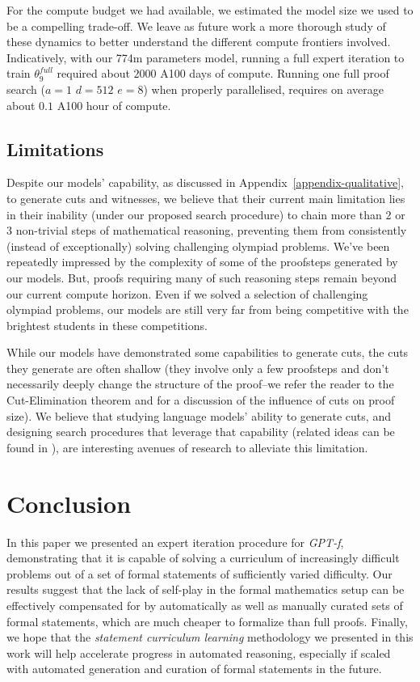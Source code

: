 \documentclass[nohyperref]{article}
\theoremstyle{plain}
\theoremstyle{definition}
\theoremstyle{remark}
\begin{document}
For the compute budget we had available, we estimated the model size we used to be a compelling trade-off. We leave as future work a more thorough study of these dynamics to better understand the different compute frontiers involved. Indicatively, with our 774m parameters model, running a full expert iteration to train $\theta_9^{\textit{full}}$ required about $2000$ A100 days of compute. Running one full proof search ($a=1$ $d=512$ $e=8$) when properly parallelised, requires on average about $0.1$ A100 hour of compute.

\subsection{Limitations}
\label {limitations}

Despite our models' capability, as discussed in Appendix~\ref{appendix-qualitative}, to generate cuts and witnesses, we believe that their current main limitation lies in their inability (under our proposed search procedure) to chain more than 2 or 3 non-trivial steps of mathematical reasoning, preventing them from consistently (instead of exceptionally) solving challenging olympiad problems. We've been repeatedly impressed by the complexity of some of the proofsteps generated by our models. But, proofs requiring many of such reasoning steps remain beyond our current compute horizon. Even if we solved a selection of challenging olympiad problems, our models are still very far from being competitive with the brightest students in these competitions.

While our models have demonstrated some capabilities to generate cuts, the cuts they generate are often shallow (they involve only a few proofsteps and don't necessarily deeply change the structure of the proof--we refer the reader to the Cut-Elimination theorem and \citet{carbone1996cuts} for a discussion of the influence of cuts on proof size). We believe that studying language models' ability to generate cuts, and designing search procedures that leverage that capability (related ideas can be found in \citet{czechowski2021subgoal}), are interesting avenues of research to alleviate this limitation.

\section{Conclusion}

In this paper we presented an expert iteration procedure for \textit{GPT-f}\cite{polu2020generative}, demonstrating that it is capable of solving a curriculum of increasingly difficult problems out of a set of formal statements of sufficiently varied difficulty. Our results suggest that the lack of self-play in the formal mathematics setup can be effectively compensated for by automatically as well as manually curated sets of formal statements, which are much cheaper to formalize than full proofs. Finally, we hope that the \textit{statement curriculum learning} methodology we presented in this work will help accelerate progress in automated reasoning, especially if scaled with automated generation and curation of formal statements in the future.
\end{document}
